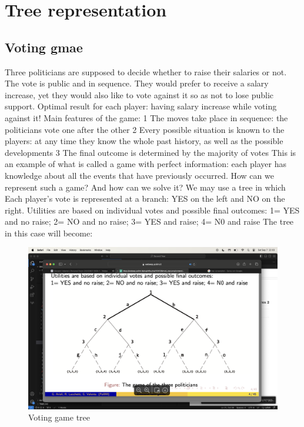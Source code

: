 \section{Tree representation}

\subsection{Voting gmae}

    Three politicians are supposed to decide whether to raise their salaries or not. The vote is public and in sequence. They would prefer to receive a salary increase,
    yet they would also like to vote against it so as not to lose public support.
    Optimal result for each player: having salary increase while voting against it!
    Main features of the game:
1 The moves take place in sequence: the politicians vote one after the other
2 Every possible situation is known to the players: at any time they know the
whole past history, as well as the possible developments
3 The final outcome is determined by the majority of votes
This is an example of what is called a game with perfect information:
each player has knowledge about all the events that have previously occurred.
How can we represent such a game? And how can we solve it?
We may use a tree in which Each player’s vote is represented at a branch: YES on the left and NO on the right. 
Utilities are based on individual votes and possible final outcomes:
1= YES and no raise; 2= NO and no raise; 3= YES and raise; 4= N0 and raise
The tree in this case will become:
\begin{figure}[H]
    \centering
    \includegraphics[width=0.75\linewidth]{images/tree.png}
    \caption{Voting game tree}
\end{figure}



